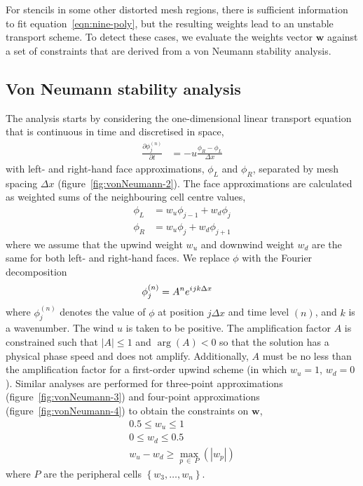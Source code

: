 \documentclass[a4paper,11pt]{article}
\newcommand{\iu}{{i\mkern1mu}}
\begin{document}
For stencils in some other distorted mesh regions, there is sufficient information to fit equation~\eqref{eqn:nine-poly}, but the resulting weights lead to an unstable transport scheme.  To detect these cases, we evaluate the weights vector $\mathbf{w}$ against a set of constraints that are derived from a von Neumann stability analysis.

\subsection*{Von Neumann stability analysis}
The analysis starts by considering the one-dimensional linear transport equation that is continuous in time and discretised in space,
\begin{align}
	\frac{\partial \phi^{(n)}_j}{\partial t} &= -u \frac{\phi_R - \phi_L}{\Delta x}
\end{align}
with left- and right-hand face approximations, $\phi_L$ and $\phi_R$, separated by mesh spacing $\Delta x$ (figure~\ref{fig:vonNeumann-2}).  The face approximations are calculated as weighted sums of the neighbouring cell centre values,
\begin{align}
\phi_L &= w_u \phi_{j-1} + w_d \phi_j \\
\phi_R &= w_u \phi_j + w_d \phi_{j+1}
\end{align}
where we assume that the upwind weight $w_u$ and downwind weight $w_d$ are the same for both left- and right-hand faces.  We replace $\phi$ with the Fourier decomposition 
\begin{align}
	\phi_j^{(n)} &= A^n e^{\iu j k \Delta x}
\end{align}
where $\phi_j^{(n)}$ denotes the value of $\phi$ at position $j \Delta x$ and time level $(n)$, and $k$ is a wavenumber.  The wind $u$ is taken to be positive.  The amplification factor $A$ is constrained such that $|A| \leq 1$ and $\arg(A) < 0$ so that the solution has a physical phase speed and does not amplify.  Additionally, $A$ must be no less than the amplification factor for a first-order upwind scheme (in which $w_u = 1$, $w_d = 0$).  Similar analyses are performed for three-point approximations (figure~\ref{fig:vonNeumann-3}) and four-point approximations (figure~\ref{fig:vonNeumann-4}) to obtain the constraints on $\mathbf{w}$,
\begin{align}
	0.5 \leq w_u \leq 1 \\
	0 \leq w_d \leq 0.5 \\
	w_u - w_d \geq \max_{p\:\in\:P}(|w_p|)
\end{align}
where $P$ are the peripheral cells $\left\{ w_3, \ldots, w_n \right\}$.
\end{document}
